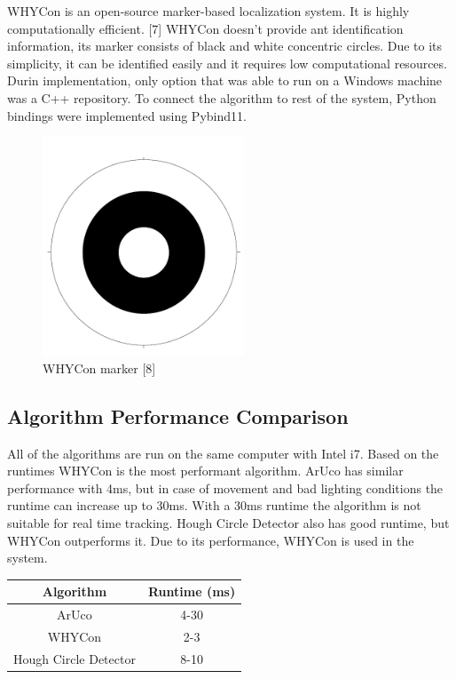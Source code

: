 WHYCon is an open-source marker-based localization system. It is
highly computationally efficient. [7] WHYCon doesn’t provide ant
identification information, its marker consists of black and white
concentric circles. Due to its simplicity, it can be identified
easily and it requires low computational resources. Durin
implementation, only option that was able to run on a Windows
machine was a C++ repository. To connect the algorithm to rest
of the system, Python bindings were implemented using Pybind11.

\begin{figure}[!htb]\centering
    \includegraphics*[width = 6cm]{bilder/project/whycon_marker.png}
    \caption{WHYCon marker [8]}
    \label{fig:whycon marker}
\end{figure}


\subsection{Algorithm Performance Comparison}

All of the algorithms are run on the same computer with Intel i7.
Based on the runtimes WHYCon is the most performant algorithm.
ArUco has similar performance with 4ms, but in case of movement
and bad lighting conditions the runtime can increase up to 30ms.
With a 30ms runtime the algorithm is not suitable for real time
tracking. Hough Circle Detector also has good runtime, but WHYCon
outperforms it. Due to its performance, WHYCon is used in the system.

\begin{table}[ht]
    \centering
    \begin{tabular}{| c | c |} %
        \hline Algorithm      & Runtime (ms) \\ \hline %
        ArUco                 & 4-30         \\
        WHYCon                & 2-3          \\
        Hough Circle Detector & 8-10         \\
        \hline
    \end{tabular}
    \label{tab:detection_algorithm_performance}
\end{table}


